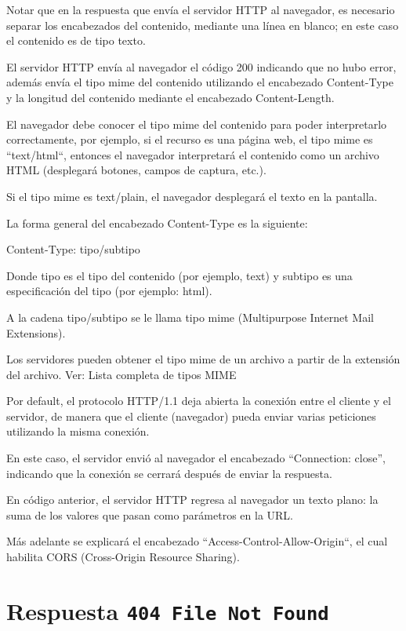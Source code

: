 \documentclass[11pt,a4paper,oneside]{book}
\begin{document}
Notar que en la respuesta que envía el servidor HTTP al navegador, es necesario separar los encabezados del contenido, mediante una línea en blanco; en este caso el contenido es de tipo texto.

El servidor HTTP envía al navegador el código 200 indicando que no hubo error, además envía el tipo mime del contenido utilizando el encabezado Content-Type y la longitud del contenido mediante el encabezado Content-Length.

El navegador debe conocer el tipo mime del contenido para poder interpretarlo correctamente, por ejemplo, si el recurso es una página web, el tipo mime es ``text/html``, entonces el navegador interpretará el contenido como un archivo HTML (desplegará botones, campos de captura, etc.).

Si el tipo mime es text/plain, el navegador desplegará el texto en la pantalla.

La forma general del encabezado Content-Type es la siguiente:

\begin{SourceCode}
Content-Type: tipo/subtipo
\end{SourceCode}

Donde tipo es el tipo del contenido (por ejemplo, text) y subtipo es una especificación del tipo (por ejemplo: html).

A la cadena tipo/subtipo se le llama tipo mime (Multipurpose Internet Mail Extensions).

Los servidores pueden obtener el tipo mime de un archivo a partir de la extensión del archivo. Ver: Lista completa de tipos MIME

Por default, el protocolo HTTP/1.1 deja abierta la conexión entre el cliente y el servidor, de manera que el cliente (navegador) pueda enviar varias peticiones utilizando la misma conexión.

En este caso, el servidor envió al navegador el encabezado “Connection: close”, indicando que la conexión se cerrará después de enviar la respuesta.

En código anterior, el servidor HTTP regresa al navegador un texto plano: la suma de los valores que pasan como parámetros en la URL.

Más adelante se explicará el encabezado ``Access-Control-Allow-Origin``, el cual habilita CORS (Cross-Origin Resource Sharing).

\section{Respuesta \texttt{404 File Not Found}}
\end{document}
